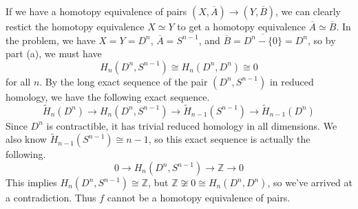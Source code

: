 \documentclass[twoside,10pt]{article}
\begin{document}
\begin{enumerate}
		If we have a homotopy equivalence of pairs $(X,\overline{A})\to (Y,\overline{B})$, we can clearly restict the homotopy equivalence $X\simeq Y$ to get a homotopy equivalence $\overline{A}\simeq \overline{B}$. In the problem, we have $X=Y=D^{n}$, $\overline{A}=S^{n-1}$, and $\overline{B}=\overline{D^{n}-\{0\}}=D^{n}$, so by part (a), we must have
		\[
			H_{n}(D^{n}, S^{n-1}) \cong H_{n}(D^{n},D^{n}) \cong 0
		\] for all $n$. By the long exact sequence of the pair $(D^{n},S^{n-1})$ in reduced homology, we have the following exact sequence.
		\[
			\tilde{H}_{n}(D^{n}) \to H_{n}(D^{n},S^{n-1}) \to \tilde{H}_{n-1}(S^{n-1}) \to \tilde{H}_{n-1}(D^{n})
		\] Since $D^{n}$ is contractible, it has trivial reduced homology in all dimensions. We also know $\tilde{H}_{n-1}(S^{n-1}) \cong n-1$, so this exact sequence is actually the following.
		\[
		0 \to H_{n}(D^{n},S^{n-1}) \to \mathbb{Z} \to 0
	\] This implies $H_{n}(D^{n},S^{n-1}) \cong \mathbb{Z}$, but $\mathbb{Z} \not\cong 0 \cong H_{n}(D^{n},D^{n})$, so we've arrived at a contradiction. Thus $f$ cannot be a homotopy equivalence of pairs.

\end{enumerate}
\end{document}
